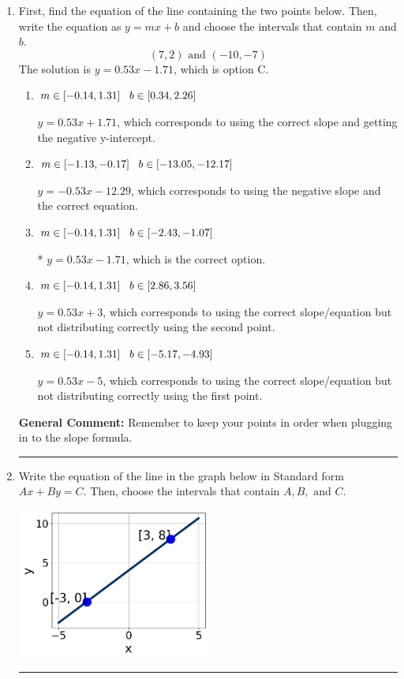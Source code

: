 \documentclass{extbook}[14pt]
\newcommand{\litem}[1]{\item #1

\rule{\textwidth}{0.4pt}}
\begin{document}
\begin{enumerate}\litem{
First, find the equation of the line containing the two points below. Then, write the equation as $ y=mx+b $ and choose the intervals that contain $m$ and $b$.
\[ (7, 2) \text{ and } (-10, -7) \]The solution is \( y = 0.53x -1.71 \), which is option C.\begin{enumerate}[label=\Alph*.]
\item \( m \in [-0.14, 1.31] \hspace*{3mm} b \in [0.34, 2.26] \)

 $y = 0.53x + 1.71$, which corresponds to using the correct slope and getting the negative y-intercept.
\item \( m \in [-1.13, -0.17] \hspace*{3mm} b \in [-13.05, -12.17] \)

 $y = -0.53x -12.29$, which corresponds to using the negative slope and the correct equation.
\item \( m \in [-0.14, 1.31] \hspace*{3mm} b \in [-2.43, -1.07] \)

* $y = 0.53x -1.71$, which is the correct option.
\item \( m \in [-0.14, 1.31] \hspace*{3mm} b \in [2.86, 3.56] \)

 $y = 0.53x + 3$, which corresponds to using the correct slope/equation but not distributing correctly using the second point.
\item \( m \in [-0.14, 1.31] \hspace*{3mm} b \in [-5.17, -4.93] \)

 $y = 0.53x -5$, which corresponds to using the correct slope/equation but not distributing correctly using the first point.
\end{enumerate}

\textbf{General Comment:} Remember to keep your points in order when plugging in to the slope formula.
}
\litem{
Write the equation of the line in the graph below in Standard form $Ax+By=C$. Then, choose the intervals that contain $A, B, \text{ and } C$.

\begin{center}
    \includegraphics[width=0.5\textwidth]{../Figures/linearGraphToStandardA.png}
\end{center}


}
\end{enumerate}
\end{document}
